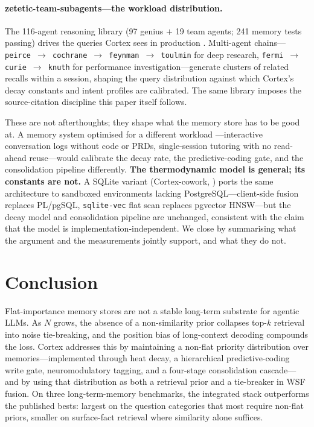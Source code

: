 \documentclass[11pt]{article}
\begin{document}
\paragraph{zetetic-team-subagents---the workload distribution.}
The 116-agent reasoning library (97 genius $+$ 19 team agents;
241 memory tests passing) drives the queries Cortex sees in
production \citep{Deust2026d}.  Multi-agent chains---\texttt{peirce
$\to$ cochrane $\to$ feynman $\to$ toulmin} for deep research,
\texttt{fermi $\to$ curie $\to$ knuth} for performance
investigation---generate clusters of related recalls within a
session, shaping the query distribution against which Cortex's
decay constants and intent profiles are calibrated.  The same
library imposes the source-citation discipline this paper itself
follows.

These are not afterthoughts; they shape what the memory store has
to be good at.  A memory system optimised for a different workload
---interactive conversation logs without code or PRDs,
single-session tutoring with no read-ahead reuse---would calibrate
the decay rate, the predictive-coding gate, and the consolidation
pipeline differently.  \textbf{The thermodynamic model is general;
its constants are not.}  A SQLite variant
(Cortex-cowork, \citealp{Deust2026e}) ports the same architecture
to sandboxed environments lacking PostgreSQL---client-side fusion
replaces PL/pgSQL, \texttt{sqlite-vec} flat scan replaces pgvector
HNSW---but the decay model and consolidation pipeline are
unchanged, consistent with the claim that the model is
implementation-independent.  We close by summarising what the
argument and the measurements jointly support, and what they do
not.

\section{Conclusion}
\label{sec:conclusion}

Flat-importance memory stores are not a stable long-term substrate
for agentic LLMs.  As $N$ grows, the absence of a non-similarity
prior collapses top-$k$ retrieval into noise tie-breaking, and the
position bias of long-context decoding compounds the loss.  Cortex
addresses this by maintaining a non-flat priority distribution over
memories---implemented through heat decay, a hierarchical
predictive-coding write gate, neuromodulatory tagging, and a
four-stage consolidation cascade---and by using that distribution
as both a retrieval prior and a tie-breaker in WSF fusion.  On
three long-term-memory benchmarks, the integrated stack outperforms
the published bests: largest on the question categories that most
require non-flat priors, smaller on surface-fact retrieval where
similarity alone suffices.
\end{document}
